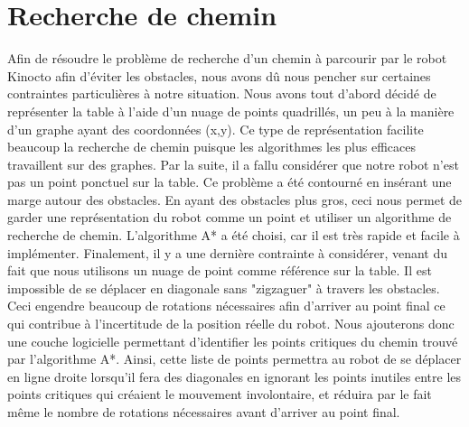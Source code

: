 \section{Recherche de chemin}
Afin de résoudre le problème de recherche d'un chemin à parcourir par le robot Kinocto afin d'éviter les obstacles, nous avons dû nous pencher sur certaines contraintes particulières à notre situation. Nous avons tout d'abord décidé de représenter la table à l'aide d'un nuage de points quadrillés, un peu à la manière d'un graphe ayant des coordonnées (x,y). Ce type de représentation facilite beaucoup la recherche de chemin puisque les algorithmes les plus efficaces travaillent sur des graphes. Par la suite, il a fallu considérer que notre robot n'est pas un point ponctuel sur la table. Ce problème a été contourné en insérant une marge autour des obstacles. En ayant des obstacles plus gros, ceci nous permet de garder une représentation du robot comme un point et utiliser un algorithme de recherche de chemin. L'algorithme A* a été choisi, car il est très rapide et facile à implémenter. Finalement, il y a une dernière contrainte à considérer, venant du fait que nous utilisons un nuage de point comme référence sur la table. Il est impossible de se déplacer en diagonale sans "zigzaguer" à travers les obstacles. Ceci engendre beaucoup de rotations nécessaires afin d'arriver au point final ce qui contribue à l'incertitude de la position réelle du robot. Nous ajouterons donc une couche logicielle permettant d'identifier les points critiques du chemin trouvé par l'algorithme A*. Ainsi, cette liste de points permettra au robot de se déplacer en ligne droite lorsqu'il fera des diagonales en ignorant les points inutiles entre les points critiques qui créaient le mouvement involontaire, et réduira par le fait même le nombre de rotations nécessaires avant d'arriver au point final. 


